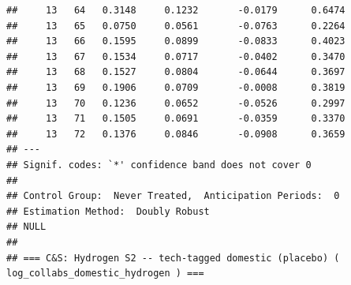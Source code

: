 \documentclass[
]{article}
\begin{document}
\begin{verbatim}
##     13   64   0.3148     0.1232       -0.0179      0.6474  
##     13   65   0.0750     0.0561       -0.0763      0.2264  
##     13   66   0.1595     0.0899       -0.0833      0.4023  
##     13   67   0.1534     0.0717       -0.0402      0.3470  
##     13   68   0.1527     0.0804       -0.0644      0.3697  
##     13   69   0.1906     0.0709       -0.0008      0.3819  
##     13   70   0.1236     0.0652       -0.0526      0.2997  
##     13   71   0.1505     0.0691       -0.0359      0.3370  
##     13   72   0.1376     0.0846       -0.0908      0.3659  
## ---
## Signif. codes: `*' confidence band does not cover 0
## 
## Control Group:  Never Treated,  Anticipation Periods:  0
## Estimation Method:  Doubly Robust
## NULL
## 
## === C&S: Hydrogen S2 -- tech-tagged domestic (placebo) ( log_collabs_domestic_hydrogen ) ===
\end{verbatim}
\end{document}
